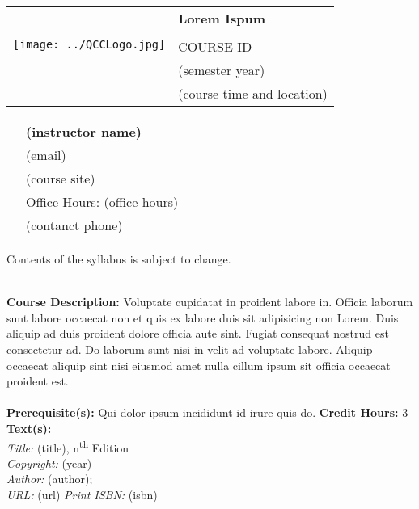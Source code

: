 \documentclass[11pt]{article}
\begin{document}
\begin{tabular}{ l l }
  \multirow{4}{*}{\texttt{[image: ../QCCLogo.jpg]}} & \textbf{\LARGE Lorem Ispum} \\\\ & \LARGE COURSE ID\\
  & \LARGE (semester year)\\
 & \LARGE (course time and location)\\
\end{tabular}
\vspace{10mm}

\begin{tabular}{ l l }
  & \large \textbf{(instructor name)} \\
  & \large (email) \\
  & \large (course site) \\
  & \large Office Hours: (office hours) \\
  & \large (contanct phone) \\
\end{tabular}
\vspace{5mm}
\begin{center} Contents of the syllabus is subject to change. \\
\end{center}

\textbf {\large \\ Course Description:} Voluptate cupidatat in proident labore in. Officia laborum sunt labore occaecat non et quis ex labore duis sit adipisicing non Lorem. Duis aliquip ad duis proident dolore officia aute sint. Fugiat consequat nostrud est consectetur ad. Do laborum sunt nisi in velit ad voluptate labore. Aliquip occaecat aliquip sint nisi eiusmod amet nulla cillum ipsum sit officia occaecat proident est.  \\\\
\textbf {Prerequisite(s):} Qui dolor ipsum incididunt id irure quis do.
\textbf {Credit Hours:} 3 \\

\textbf {\large Text(s):} \\

\emph{Title:} (title), n\textsuperscript{th} Edition \\
\emph {Copyright:} (year) \\
\emph {Author:} (author);\\
\emph {URL:} (url)
\emph {Print ISBN:} (isbn)\\
\end{document}
